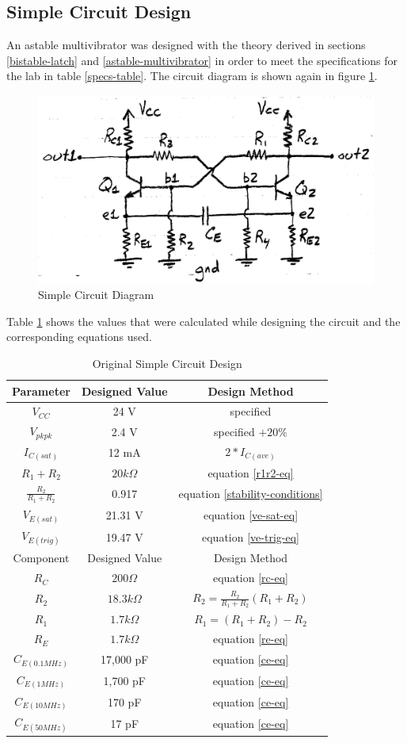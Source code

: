 \documentclass[titlepage, letterpaper, 10.5pt]{article}
\begin{document}
\subsection{Simple Circuit Design}

An astable multivibrator was designed with the theory derived in sections
\ref{bistable-latch} and \ref{astable-multivibrator} in order to meet the
specifications for the lab in table \ref{specs-table}.
The circuit diagram is shown again in figure \ref{simple-circuit-2}.

\begin{figure}[ht]
	\centering
	\includegraphics[width=.5\textwidth]{diagrams/simple-circuit}
	\caption{Simple Circuit Diagram}
	\label{simple-circuit-2}
\end{figure}

Table \ref{simple-circuit-design-table} shows the values that were calculated
while designing the circuit and the corresponding equations used.

\begin{table}[ht]
\centering
\caption{Original Simple Circuit Design}
\begin{tabular}{c | c | c}
\hline\hline
Parameter	&Designed Value	&Design Method	\\
\hline\hline
$V_{CC}$	&24 V	&specified	\\
$V_{pkpk}$	&2.4 V	&specified $+20\%$	\\
$I_{C(sat)}$	&12 mA	&$2*I_{C(ave)}$	\\
$R_{1}+R_{2}$	&$20k\Omega$	&equation \ref{r1r2-eq}	\\
$\frac{R_{2}}{R_{1}+R_{2}}$	&0.917	&equation \ref{stability-conditions}	\\
$V_{E(sat)}$	&21.31 V	&equation \ref{ve-sat-eq}	\\
$V_{E(trig)}$	&19.47 V	&equation \ref{ve-trig-eq}	\\
\hline
Component	&Designed Value	&Design Method	\\
\hline
$R_{C}$	&$200\Omega$	&equation \ref{rc-eq}	\\
$R_{2}$	&$18.3k\Omega$	&$R_{2}=\frac{R_{2}}{R_{1}+R_{2}}(R_{1}+R_{2})$	\\
$R_{1}$	&$1.7k\Omega$	&$R_{1}=(R_{1}+R_{2})-R_{2}$	\\
$R_{E}$	&$1.7k\Omega$	&equation \ref{re-eq}	\\
$C_{E(0.1MHz)}$	&17,000 pF	&equation \ref{ce-eq}	\\
$C_{E(1MHz)}$	&1,700 pF	&equation \ref{ce-eq}	\\
$C_{E(10MHz)}$	&170 pF	&equation \ref{ce-eq}	\\
$C_{E(50MHz)}$	&17 pF	&equation \ref{ce-eq}	\\
\hline\hline
\end{tabular}
\label{simple-circuit-design-table}
\end{table}
\end{document}

